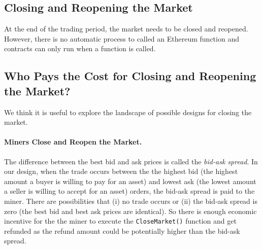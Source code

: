 
\subsection{Closing and Reopening the Market}


At the end of the trading period, the market needs to be closed and reopened. However, there is no automatic process to called an Ethereum function and contracts can only run when a function is called. 







\subsection{Who Pays the Cost for Closing and Reopening the Market?}

We think it is useful to explore the landscape of possible designs for closing the market. 

\paragraph{Miners Close and Reopen the Market.} The difference between the best bid and ask prices is called the \textit{bid-ask spread}. In our design, when the trade occurs between the the highest bid (the highest amount a buyer is willing to pay for an asset) and lowest ask (the lowest amount a seller is willing to accept for an asset) orders, the bid-ask spread is paid to the miner. There are possibilities that (i) no trade occurs or (ii) the bid-ask spread is zero (\ie the best bid and best ask prices are identical). So there is enough economic incentive for the the miner to execute the \texttt{CloseMarket()} function and get refunded as the refund amount could be potentially higher than the bid-ask spread. 


